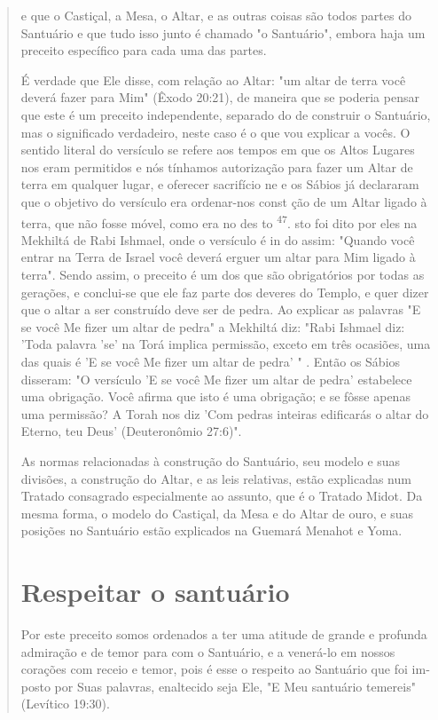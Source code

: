 \begin{quote}e que o Castiçal, a Mesa, o Altar, e as outras coisas são todos partes
do Santuário e que tudo isso junto é chamado "o Santuário", embora haja
um preceito espe­cífico para cada uma das partes.

É verdade que Ele disse, com relação ao Altar: "um altar de terra vo­cê
deverá fazer para Mim" (Êxodo 20:21), de maneira que se poderia pensar
que este é um preceito independente, separado do de construir o
Santuário, mas o significado verdadeiro, neste caso é o que vou explicar
a vocês. O senti­do literal do versículo se refere aos tempos em que os
Altos Lugares nos eram permitidos e nós tínhamos autorização para fazer
um Altar de terra em qual­quer lugar, e oferecer sacrifício ne e os
Sábios já declararam que o objetivo do versículo era ordenar-nos const
ção de um Altar ligado à terra, que não fosse móvel, como era no des to
\textsuperscript{47}. sto foi dito por eles na Mekhiltá de Rabi Ishmael,
onde o versículo é in do assim: "Quando você entrar na Terra de Israel
você deverá erguer um altar para Mim ligado à terra". Sendo assim, o
preceito é um dos que são obrigatórios por todas as gerações, e
conclui-se que ele faz parte dos deveres do Templo, e quer dizer que o
altar a ser construí­do deve ser de pedra. Ao explicar as palavras "E se
você Me fizer um altar de pedra" a Mekhiltá diz: "Rabi Ishmael diz:
'Toda palavra 'se' na Torá implica permissão, exceto em três ocasiões,
uma das quais é 'E se você Me fizer um altar de pedra' " . Então os
Sábios disseram: "O versículo 'E se você Me fizer um altar de pedra'
estabelece uma obrigação. Você afirma que isto é uma obri­gação; e se
fôsse apenas uma permissão? A Torah nos diz 'Com pedras inteiras
edificarás o altar do Eterno, teu Deus' (Deuteronômio 27:6)".

As normas relacionadas à construção do Santuário, seu modelo e suas
divisões, a construção do Altar, e as leis relativas, estão explicadas
num Trata­do consagrado especialmente ao assunto, que é o Tratado Midot.
Da mesma forma, o modelo do Castiçal, da Mesa e do Altar de ouro, e suas
posições no Santuário estão explicados na Guemará Menahot e Yoma.

\section{Respeitar o santuário}

Por este preceito somos ordenados a ter uma atitude de grande e profunda
admiração e de temor para com o Santuário, e a venerá-lo em nossos
corações com receio e temor, pois é esse o respeito ao Santuário que foi
im­posto por Suas palavras, enaltecido seja Ele, "E Meu santuário
temereis" (Leví­tico 19:30).


\end{quote}
